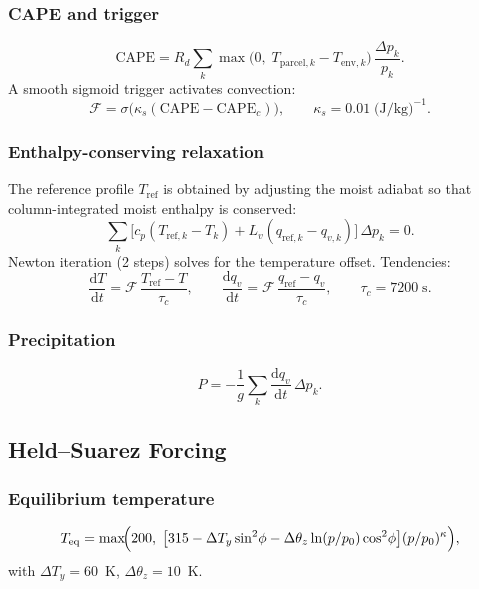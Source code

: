 \documentclass[11pt,a4paper]{article}
\newcommand{\dd}{\mathrm{d}}
\newcommand{\Rd}{R_d}
\newcommand{\cpd}{c_p}
\newcommand{\Lv}{L_v}
\newcommand{\pref}{p_0}
\begin{document}
\subsubsection{CAPE and trigger}
\begin{equation}
  \mathrm{CAPE} = \Rd\sum_k \max\!\bigl(0,\;T_{\mathrm{parcel},k}-T_{\mathrm{env},k}\bigr)\,\frac{\Delta p_k}{p_k}.
\end{equation}
A smooth sigmoid trigger activates convection:
\begin{equation}
  \mathcal F = \sigma\!\bigl(\kappa_s(\mathrm{CAPE}-\mathrm{CAPE}_c)\bigr), \qquad \kappa_s=0.01\;\text{(J/kg)}^{-1}.
\end{equation}

\subsubsection{Enthalpy-conserving relaxation}
The reference profile $T_{\mathrm{ref}}$ is obtained by adjusting the moist adiabat so that column-integrated moist enthalpy is conserved:
\begin{equation}
  \sum_k\bigl[\cpd(T_{\mathrm{ref},k}-T_k)+\Lv(q_{\mathrm{ref},k}-q_{v,k})\bigr]\,\Delta p_k = 0.
\end{equation}
Newton iteration (2 steps) solves for the temperature offset.  Tendencies:
\begin{equation}
  \frac{\dd T}{\dd t} = \mathcal F\,\frac{T_{\mathrm{ref}}-T}{\tau_c}, \qquad
  \frac{\dd q_v}{\dd t} = \mathcal F\,\frac{q_{\mathrm{ref}}-q_v}{\tau_c}, \qquad \tau_c=7200\;\text{s}.
\end{equation}

\subsubsection{Precipitation}
\begin{equation}
  P = -\frac{1}{g}\sum_k \frac{\dd q_v}{\dd t}\,\Delta p_k.
\end{equation}

\subsection{Held--Suarez Forcing}

\subsubsection{Equilibrium temperature}
\begin{equation}
  T_{\mathrm{eq}} = \max\!\Bigl(200,\;\bigl[315-\Delta T_y\sin^2\!\phi - \Delta\theta_z\ln(p/\pref)\cos^2\!\phi\bigr](p/\pref)^\kappa\Bigr),
\end{equation}
with $\Delta T_y=60$~K, $\Delta\theta_z=10$~K.
\end{document}
